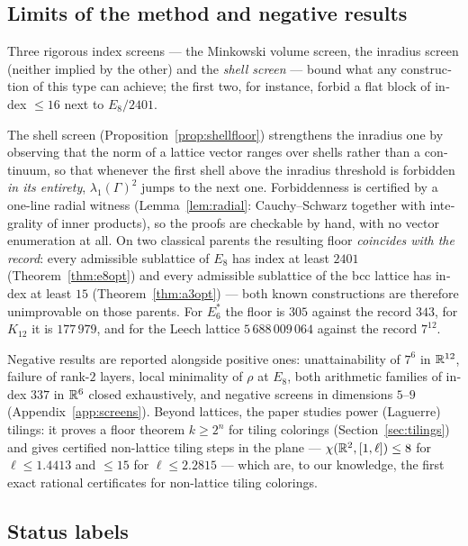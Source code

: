 \begin{otherlanguage}{english}
\subsection*{Limits of the method and negative results}

Three rigorous index screens --- the Minkowski volume screen, the inradius
screen (neither implied by the other) and the \emph{shell screen} --- bound
what any construction of this type can achieve; the first two, for instance,
forbid a flat block of index $\le16$ next to $E_8/2401$.

The shell screen (Proposition~\ref{prop:shellfloor}) strengthens the inradius
one by observing that the norm of a lattice vector ranges over shells rather
than a continuum, so that whenever the first shell above the inradius threshold
is forbidden \emph{in its entirety}, $\lambda_1(\Gamma)^2$ jumps to the next
one. Forbiddenness is certified by a one-line radial witness
(Lemma~\ref{lem:radial}: Cauchy--Schwarz together with integrality of inner
products), so the proofs are checkable by hand, with no vector enumeration at
all. On two classical parents the resulting floor \emph{coincides with the
record}: every admissible sublattice of $E_8$ has index at least $2401$
(Theorem~\ref{thm:e8opt}) and every admissible sublattice of the bcc lattice
has index at least $15$ (Theorem~\ref{thm:a3opt}) --- both known constructions
are therefore unimprovable on those parents. For $E_6^*$ the floor is $305$
against the record $343$, for $K_{12}$ it is $177\,979$, and for the Leech
lattice $5\,688\,009\,064$ against the record $7^{12}$.

Negative results are reported alongside
positive ones: unattainability of $7^6$ in $\mathbb{R}^{12}$, failure of rank-$2$
layers, local minimality of $\rho$ at $E_8$, both arithmetic families of index
$337$ in $\mathbb{R}^6$ closed exhaustively, and negative
screens in dimensions $5$--$9$ (Appendix~\ref{app:screens}). Beyond
lattices, the paper studies power (Laguerre) tilings: it proves a floor
theorem $k\ge2^n$ for tiling colorings (Section~\ref{sec:tilings}) and gives
certified non-lattice tiling steps in the plane --- $\chi(\mathbb{R}^2,[1,\ell])\le8$
for $\ell\le1.4413$ and $\le15$ for $\ell\le2.2815$ --- which are, to our
knowledge, the first exact rational certificates for non-lattice tiling
colorings.

\subsection*{Status labels}


\end{otherlanguage}
